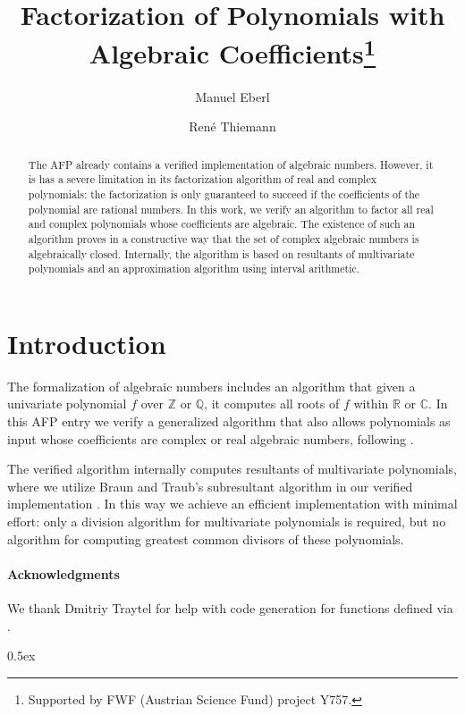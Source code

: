 \documentclass[11pt,a4paper]{article}
\newcommand\rats{\mathbb{Q}}
\newcommand\ints{\mathbb{Z}}
\newcommand\reals{\mathbb{R}}
\newcommand\complex{\mathbb{C}}
\begin{document}
\title{Factorization of Polynomials with Algebraic Coefficients\footnote{Supported by FWF (Austrian Science Fund) project Y757.}}
\author{Manuel Eberl \and Ren\'e Thiemann}
\maketitle

\begin{abstract}
The AFP already contains a verified implementation of algebraic numbers.
However, it is has a severe limitation in its 
factorization algorithm of real and complex polynomials: the factorization is only
guaranteed to succeed if the coefficients of the polynomial are rational numbers. 
In this work, we verify an algorithm to factor all real and complex polynomials
whose coefficients are algebraic. 
The existence of such an algorithm proves in a constructive way that the set of complex algebraic numbers
is algebraically closed.
Internally, the algorithm is based on resultants of multivariate 
polynomials and an approximation algorithm using interval arithmetic.
\end{abstract}

\tableofcontents

\section{Introduction}

The formalization of algebraic numbers \cite{Algebraic_Numbers,Algebraic_Numbers-AFP}
includes an algorithm that given
a univariate polynomial $f$ over $\ints$ or $\rats$, it computes all roots of $f$ within
$\reals$ or $\complex$. In this AFP entry we verify a generalized algorithm that also allows
polynomials as input whose coefficients are complex or real algebraic numbers, following 
\cite[Section~3]{jsc}. 

The verified algorithm internally computes resultants of
multivariate polynomials, where we utilize Braun and Traub's subresultant algorithm in our
verified implementation \cite{Brown,BrownTraub,Subresultants-AFP}. In this way we achieve an
efficient implementation with minimal effort: only a division algorithm for multivariate polynomials
is required, but no algorithm for computing greatest common divisors of these polynomials.

\paragraph{Acknowledgments}
We thank Dmitriy Traytel for help with code generation for functions defined via 
. 
 

\parindent 0pt\parskip 0.5ex





\end{document}
